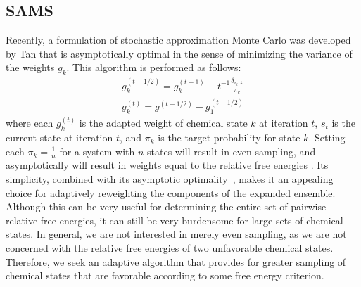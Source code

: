 \subsection{SAMS}
%
Recently, a formulation of stochastic approximation Monte Carlo was developed by Tan \cite{Tan2017} that is asymptotically optimal in the sense of minimizing the variance of the weights $g_k$.
%
This algorithm is performed as follows:
%
\begin{eqnarray} \label{binary-sams-sa}
     g^{(t-1/2)}_k = g^{(t-1)}_k - t^{-1} \frac{\delta_{s_t,k}}{\pi_k} \\
     g^{(t)}_k = g^{(t-1/2)} - g^{(t-1/2)}_1
\end{eqnarray}
%
\noindent where each $g^{(t)}_k$ is the adapted weight of chemical state $k$ at iteration $t$, $s_t$ is the current state at iteration $t$, and $\pi_k$ is the target probability for state $k$.
%
Setting each $\pi_k = \frac{1}{n}$ for a system with $n$ states will result in even sampling, and asymptotically will result in weights equal to the relative free energies \cite{Tan2017}.
%
%
Its simplicity, combined with its asymptotic optimality~\cite{Tan2017}, makes it an appealing choice for adaptively reweighting the components of the expanded ensemble.
%
Although this can be very useful for determining the entire set of pairwise relative free energies, it can still be very burdensome for large sets of chemical states.
%
In general, we are not interested in merely even sampling, as we are not concerned with the relative free energies of two unfavorable chemical states.
%
Therefore, we seek an adaptive algorithm that provides for greater sampling of chemical states that are favorable according to some free energy criterion.
%
